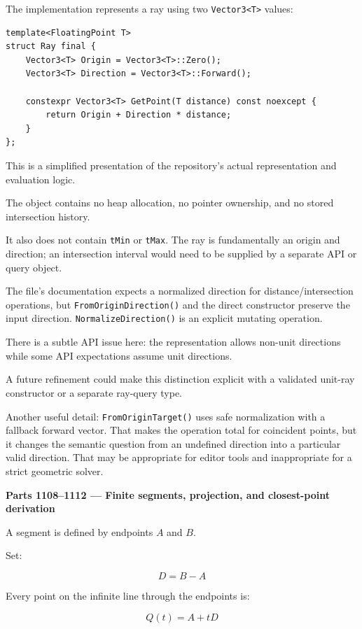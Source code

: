 The implementation represents a ray using two \texttt{Vector3\textless{}T\textgreater{}} values:

\begin{verbatim}
template<FloatingPoint T>
struct Ray final {
    Vector3<T> Origin = Vector3<T>::Zero();
    Vector3<T> Direction = Vector3<T>::Forward();

    constexpr Vector3<T> GetPoint(T distance) const noexcept {
        return Origin + Direction * distance;
    }
};
\end{verbatim}

This is a simplified presentation of the repository's actual representation and evaluation logic.

The object contains no heap allocation, no pointer ownership, and no stored intersection history.

It also does not contain \texttt{tMin} or \texttt{tMax}. The ray is fundamentally an origin and direction; an intersection interval would need to be supplied by a separate API or query object.

The file's documentation expects a normalized direction for distance/intersection operations, but \texttt{FromOriginDirection()} and the direct constructor preserve the input direction. \texttt{NormalizeDirection()} is an explicit mutating operation.

There is a subtle API issue here: the representation allows non-unit directions while some API expectations assume unit directions.

A future refinement could make this distinction explicit with a validated unit-ray constructor or a separate ray-query type.

Another useful detail: \texttt{FromOriginTarget()} uses safe normalization with a fallback forward vector. That makes the operation total for coincident points, but it changes the semantic question from an undefined direction into a particular valid direction. That may be appropriate for editor tools and inappropriate for a strict geometric solver.

\textbf{Parts 1108--1112 --- Finite segments, projection, and closest-point derivation}

A segment is defined by endpoints \(A\) and \(B\).

Set:

\[
D=B-A
\]

Every point on the infinite line through the endpoints is:

\[
Q(t)=A+tD
\]

